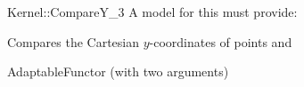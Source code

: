 \begin{ccRefFunctionObjectConcept}{Kernel::CompareY_3}
A model for this must provide:


      {Compares the Cartesian $y$-coordinates of points  and
      }

\ccRefines
AdaptableFunctor (with two arguments)

\ccSeeAlso
{}\\

\end{ccRefFunctionObjectConcept}
